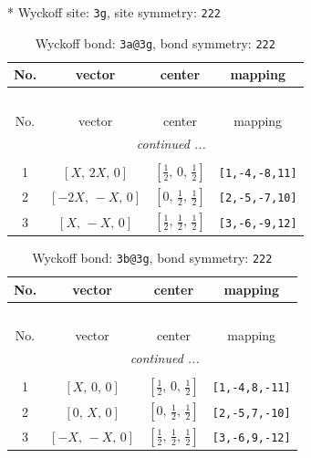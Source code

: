 \documentclass[fleqn,8pt]{jsarticle}
\begin{document}
* Wyckoff site: {\tt 3g}, site symmetry: {\tt 222}
\renewcommand{\arraystretch}{1.2}
\begin{longtable}{cccc}
\caption{Wyckoff bond: {\tt 3a@3g}, bond symmetry: {\tt 222}}
 \\
 \hline \hline
No. & vector & center & mapping \\ \hline \endfirsthead

\multicolumn{3}{l}{\tablename\ \thetable{}} \\
 \hline \hline
No. & vector & center & mapping \\ \hline \endhead

 \hline \hline
\multicolumn{3}{r}{\footnotesize\it continued ...} \\ \endfoot

 \hline \hline
\multicolumn{3}{r}{} \\ \endlastfoot

1 & $\left[ X,\, 2 X,\, 0 \right]$ & $\left[ \frac{1}{2},\, 0,\, \frac{1}{2} \right]$ & {\tt [1,-4,-8,11]} \\ \hline
2 & $\left[ - 2 X,\, - X,\, 0 \right]$ & $\left[ 0,\, \frac{1}{2},\, \frac{1}{2} \right]$ & {\tt [2,-5,-7,10]} \\ \hline
3 & $\left[ X,\, - X,\, 0 \right]$ & $\left[ \frac{1}{2},\, \frac{1}{2},\, \frac{1}{2} \right]$ & {\tt [3,-6,-9,12]} \\
\end{longtable}
\renewcommand{\arraystretch}{1.2}
\begin{longtable}{cccc}
\caption{Wyckoff bond: {\tt 3b@3g}, bond symmetry: {\tt 222}}
 \\
 \hline \hline
No. & vector & center & mapping \\ \hline \endfirsthead

\multicolumn{3}{l}{\tablename\ \thetable{}} \\
 \hline \hline
No. & vector & center & mapping \\ \hline \endhead

 \hline \hline
\multicolumn{3}{r}{\footnotesize\it continued ...} \\ \endfoot

 \hline \hline
\multicolumn{3}{r}{} \\ \endlastfoot

1 & $\left[ X,\, 0,\, 0 \right]$ & $\left[ \frac{1}{2},\, 0,\, \frac{1}{2} \right]$ & {\tt [1,-4,8,-11]} \\ \hline
2 & $\left[ 0,\, X,\, 0 \right]$ & $\left[ 0,\, \frac{1}{2},\, \frac{1}{2} \right]$ & {\tt [2,-5,7,-10]} \\ \hline
3 & $\left[ - X,\, - X,\, 0 \right]$ & $\left[ \frac{1}{2},\, \frac{1}{2},\, \frac{1}{2} \right]$ & {\tt [3,-6,9,-12]} \\
\end{longtable}
\end{document}
